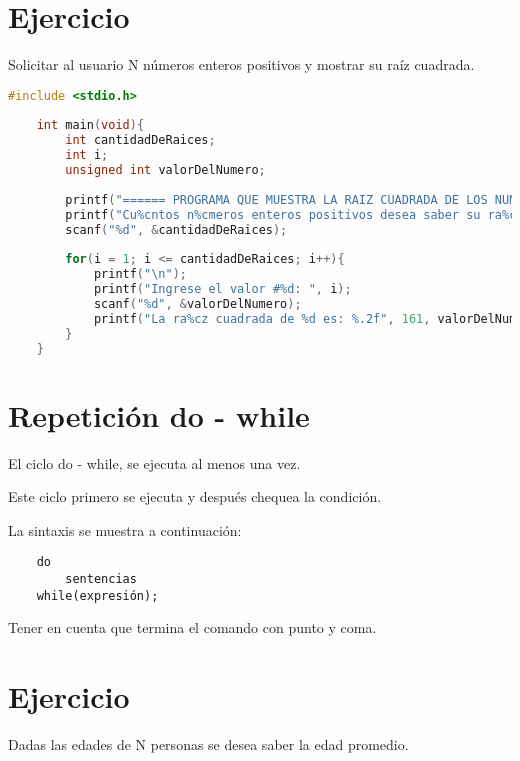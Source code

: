 \section [Ejercicio]{Ejercicio}
Solicitar al usuario N números enteros positivos y mostrar su raíz cuadrada.

\begin{lstlisting}[language=C, caption={Raíz cuadrana de N números positivos}, style=codigoenc]
	#include <stdio.h>
	
	int main(void){
		int cantidadDeRaices;
		int i;
		unsigned int valorDelNumero;
		
		printf("====== PROGRAMA QUE MUESTRA LA RAIZ CUADRADA DE LOS NUMEROS ENTEROS POSITIVOS ======\n\n");
		printf("Cu%cntos n%cmeros enteros positivos desea saber su ra%cz cuadrada: ", 160, 163, 161);
		scanf("%d", &cantidadDeRaices);
		
		for(i = 1; i <= cantidadDeRaices; i++){
			printf("\n");
			printf("Ingrese el valor #%d: ", i);
			scanf("%d", &valorDelNumero);
			printf("La ra%cz cuadrada de %d es: %.2f", 161, valorDelNumero, sqrt(valorDelNumero));
		}
	}
\end{lstlisting}












\section [Repetición do - while]{Repetición do - while}
{El ciclo do - while, se ejecuta al menos una vez.}

\vspace{1em}
Este ciclo primero se ejecuta y después chequea la condición.

\vspace{1em}
La sintaxis se muestra a continuación:

\begin{verbatim}
	do
		sentencias
	while(expresión);
\end{verbatim}

\space{1em}
Tener en cuenta que termina el comando con punto y coma.

\section [Ejercicio]{Ejercicio}
Dadas las edades de N personas se desea saber la edad promedio.


